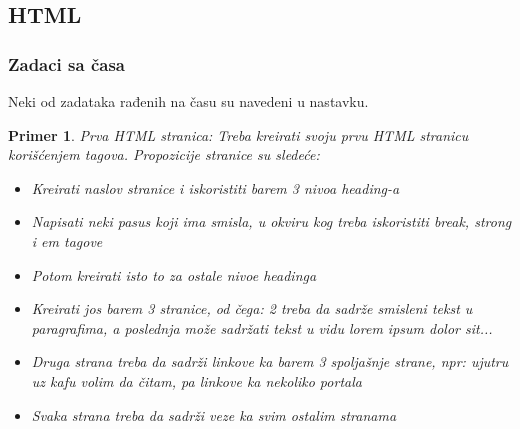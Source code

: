 \documentclass[a4paper]{article}
\newtheorem{primer}{Primer}[section]
\begin{document}
\subsection{HTML}
\subsubsection{Zadaci sa časa}
Neki od zadataka rađenih na času su navedeni u nastavku.

\begin{primer}
Prva HTML stranica: Treba kreirati svoju prvu HTML stranicu korišćenjem tagova. Propozicije stranice su sledeće:
\begin{itemize}
\item Kreirati naslov stranice i iskoristiti barem 3 nivoa heading-a
\item Napisati neki pasus koji ima smisla, u okviru kog treba iskoristiti break, strong i em tagove
\item Potom kreirati isto to za ostale nivoe headinga
\item Kreirati jos barem 3 stranice, od čega: 2 treba da sadrže smisleni tekst u paragrafima, a poslednja može sadržati tekst u vidu \textit{lorem ipsum dolor sit...}
\item Druga strana treba da sadrži linkove ka barem 3 spoljašnje strane, npr: ujutru uz kafu volim da čitam, pa linkove ka nekoliko portala
\item Svaka strana treba da sadrži veze ka svim ostalim stranama
\end{itemize}
\end{primer}
\end{document}
